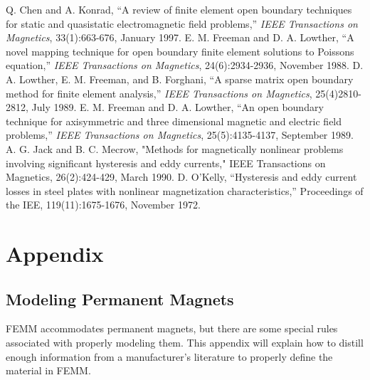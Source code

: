 \documentclass[12pt]{report}
\begin{document}
\begin{thebibliography}{99}
 Q. Chen and A. Konrad, ``A review of finite element
open boundary techniques for static and quasistatic electromagnetic
field problems,'' {\em IEEE Transactions on Magnetics},
33(1):663-676, January 1997.
 E. M. Freeman and D. A. Lowther, ``A novel
mapping technique for open boundary finite element solutions to
Poissons equation,'' {\em IEEE Transactions on Magnetics},
24(6):2934-2936, November 1988.
 D. A. Lowther, E. M. Freeman, and B.
Forghani, ``A sparse matrix open boundary method for finite element
analysis,'' {\em IEEE Transactions on Magnetics}, 25(4)2810-2812,
July 1989.
 E. M. Freeman and D. A. Lowther, ``An open
boundary technique for axisymmetric and three dimensional magnetic
and electric field problems,'' {\em IEEE Transactions on
Magnetics}, 25(5):4135-4137, September 1989.
 A. G. Jack and B. C. Mecrow, "Methods for magnetically nonlinear
problems involving significant hysteresis and eddy currents," IEEE
Transactions on Magnetics, 26(2):424-429, March 1990.
 D. O'Kelly, ``Hysteresis and eddy current losses in
steel plates with nonlinear magnetization characteristics,''
Proceedings of the IEE, 119(11):1675-1676, November 1972.
\end{thebibliography}
\newpage
\appendix
\chapter{Appendix}

\section{Modeling Permanent Magnets} \label{app_pm}

FEMM accommodates permanent magnets, but there are some special
rules associated with properly modeling them.  This appendix will
explain how to distill enough information from a manufacturer's
literature to properly define the material in FEMM.
\end{document}
